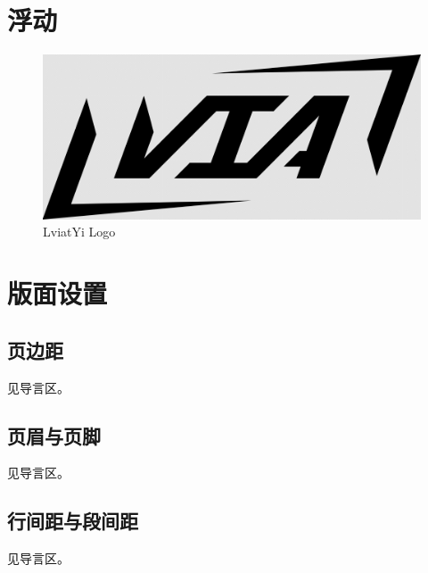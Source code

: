 \documentclass[UTF8]{ctexart}
\begin{document}
\section{浮动}

\begin{figure}[htbp]
    \centering
    \includegraphics[width = .5\textwidth]{assets/pic/Lviat Logo.png}
    \caption{LviatYi Logo}
    \label{fig:myphoto}
\end{figure}

\section{版面设置}

\subsection{页边距}

见导言区。

\subsection{页眉与页脚}

见导言区。

\subsection{行间距与段间距}

见导言区。
\end{document}
